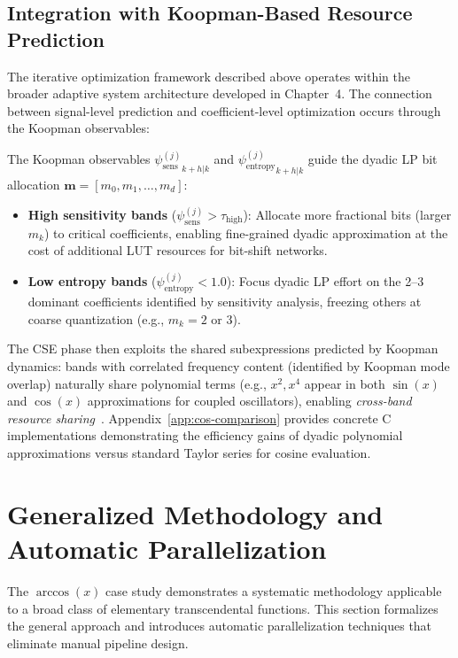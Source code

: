 \subsection{Integration with Koopman-Based Resource Prediction}

The iterative optimization framework described above operates within the broader adaptive system architecture developed in Chapter~4. The connection between signal-level prediction and coefficient-level optimization occurs through the Koopman observables:

The Koopman observables ${\psi_{\text{sens}}^{(j)}}_{k+h|k}$ and ${\psi_{\text{entropy}}^{(j)}}_{k+h|k}$ guide the dyadic LP bit allocation $\mathbf{m} = [m_0, m_1, \ldots, m_d]$:
\begin{itemize}
    \item \textbf{High sensitivity bands} ($\psi_{\text{sens}}^{(j)} > \tau_{\text{high}}$): Allocate more fractional bits (larger $m_k$) to critical coefficients, enabling fine-grained dyadic approximation at the cost of additional LUT resources for bit-shift networks.
    \item \textbf{Low entropy bands} ($\psi_{\text{entropy}}^{(j)} < 1.0$): Focus dyadic LP effort on the 2--3 dominant coefficients identified by sensitivity analysis, freezing others at coarse quantization (e.g., $m_k = 2$ or $3$).
\end{itemize}

The CSE phase then exploits the shared subexpressions predicted by Koopman dynamics: bands with correlated frequency content (identified by Koopman mode overlap) naturally share polynomial terms (e.g., $x^2, x^4$ appear in both $\sin(x)$ and $\cos(x)$ approximations for coupled oscillators), enabling \emph{cross-band resource sharing}~\cite{Gustafsson2007}. Appendix~\ref{app:cos-comparison} provides concrete C implementations demonstrating the efficiency gains of dyadic polynomial approximations versus standard Taylor series for cosine evaluation.

\section{Generalized Methodology and Automatic Parallelization}

The $\arccos(x)$ case study demonstrates a systematic methodology applicable to a broad class of elementary transcendental functions. This section formalizes the general approach and introduces automatic parallelization techniques that eliminate manual pipeline design.

